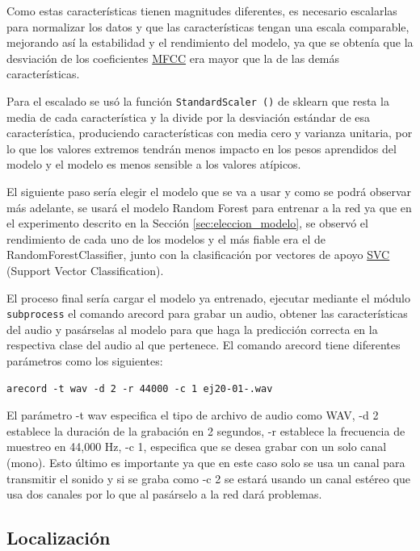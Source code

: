 Como estas características tienen magnitudes diferentes, es necesario escalarlas para normalizar los datos y que las características tengan una escala comparable, mejorando así la estabilidad y el rendimiento del modelo, ya que se obtenía que la desviación de los coeficientes \hyperlink{MFCC}{MFCC} era mayor que la de las demás características. 

Para el escalado se usó la función \verb|StandardScaler ()| de sklearn que resta la media de cada característica y la divide por la desviación estándar de esa característica, produciendo características con media cero y varianza unitaria, por lo que los valores extremos tendrán menos impacto en los pesos aprendidos del modelo y el modelo es menos sensible a los valores atípicos. 

El siguiente paso sería elegir el modelo que se va a usar y como se podrá observar más adelante, se usará el modelo Random Forest para entrenar a la red ya que en el experimento descrito en la Sección \ref{sec:eleccion_modelo}, se observó el rendimiento de cada uno de los modelos y el más fiable era el de RandomForestClassifier, junto con la clasificación por vectores de apoyo \hyperlink{SVC}{SVC} (Support Vector Classification).

El proceso final sería cargar el modelo ya entrenado, ejecutar mediante el módulo \texttt{subprocess} el comando arecord para grabar un audio, obtener las características del audio y pasárselas al modelo para que haga la predicción correcta en la respectiva clase del audio al que pertenece. El comando arecord tiene diferentes parámetros como los siguientes: 

\begin{verbatim}
arecord -t wav -d 2 -r 44000 -c 1 ej20-01-.wav 
\end{verbatim}

El parámetro -t wav especifica el tipo de archivo de audio como WAV, -d 2 establece la duración de la grabación en 2 segundos, -r establece la frecuencia de muestreo en 44,000 Hz, -c 1, especifica que se desea grabar con un solo canal (mono). Esto último es importante ya que en este caso solo se usa un canal para transmitir el sonido y si se graba como -c 2 se estará usando un canal estéreo que usa dos canales por lo que al pasárselo a la red dará problemas.


\subsection{Localización}
\label{subsec:localización}

